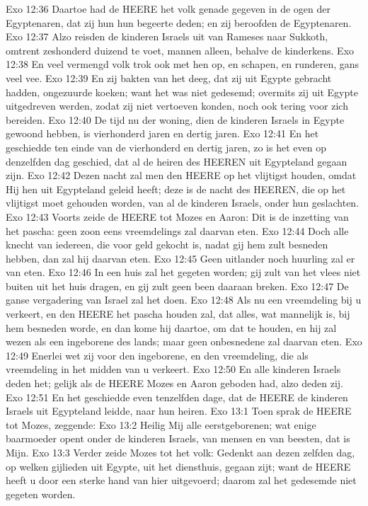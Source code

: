 Exo 12:36  Daartoe had de HEERE het volk genade gegeven in de ogen der Egyptenaren, dat zij hun hun begeerte deden; en zij beroofden de Egyptenaren.
Exo 12:37  Alzo reisden de kinderen Israels uit van Rameses naar Sukkoth, omtrent zeshonderd duizend te voet, mannen alleen, behalve de kinderkens.
Exo 12:38  En veel vermengd volk trok ook met hen op, en schapen, en runderen, gans veel vee.
Exo 12:39  En zij bakten van het deeg, dat zij uit Egypte gebracht hadden, ongezuurde koeken; want het was niet gedesemd; overmits zij uit Egypte uitgedreven werden, zodat zij niet vertoeven konden, noch ook tering voor zich bereiden.
Exo 12:40  De tijd nu der woning, dien de kinderen Israels in Egypte gewoond hebben, is vierhonderd jaren en dertig jaren.
Exo 12:41  En het geschiedde ten einde van de vierhonderd en dertig jaren, zo is het even op denzelfden dag geschied, dat al de heiren des HEEREN uit Egypteland gegaan zijn.
Exo 12:42  Dezen nacht zal men den HEERE op het vlijtigst houden, omdat Hij hen uit Egypteland geleid heeft; deze is de nacht des HEEREN, die op het vlijtigst moet gehouden worden, van al de kinderen Israels, onder hun geslachten.
Exo 12:43  Voorts zeide de HEERE tot Mozes en Aaron: Dit is de inzetting van het pascha: geen zoon eens vreemdelings zal daarvan eten.
Exo 12:44  Doch alle knecht van iedereen, die voor geld gekocht is, nadat gij hem zult besneden hebben, dan zal hij daarvan eten.
Exo 12:45  Geen uitlander noch huurling zal er van eten.
Exo 12:46  In een huis zal het gegeten worden; gij zult van het vlees niet buiten uit het huis dragen, en gij zult geen been daaraan breken.
Exo 12:47  De ganse vergadering van Israel zal het doen.
Exo 12:48  Als nu een vreemdeling bij u verkeert, en den HEERE het pascha houden zal, dat alles, wat mannelijk is, bij hem besneden worde, en dan kome hij daartoe, om dat te houden, en hij zal wezen als een ingeborene des lands; maar geen onbesnedene zal daarvan eten.
Exo 12:49  Enerlei wet zij voor den ingeborene, en den vreemdeling, die als vreemdeling in het midden van u verkeert.
Exo 12:50  En alle kinderen Israels deden het; gelijk als de HEERE Mozes en Aaron geboden had, alzo deden zij.
Exo 12:51  En het geschiedde even tenzelfden dage, dat de HEERE de kinderen Israels uit Egypteland leidde, naar hun heiren.
Exo 13:1  Toen sprak de HEERE tot Mozes, zeggende:
Exo 13:2  Heilig Mij alle eerstgeborenen; wat enige baarmoeder opent onder de kinderen Israels, van mensen en van beesten, dat is Mijn.
Exo 13:3  Verder zeide Mozes tot het volk: Gedenkt aan dezen zelfden dag, op welken gijlieden uit Egypte, uit het diensthuis, gegaan zijt; want de HEERE heeft u door een sterke hand van hier uitgevoerd; daarom zal het gedesemde niet gegeten worden.
